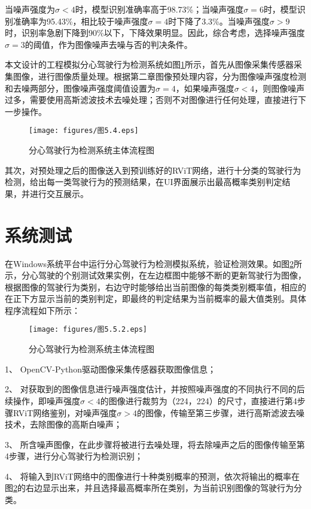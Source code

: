 当噪声强度为$\sigma<4$时，模型识别准确率高于98.73\%；当噪声强度$\sigma=6$时，模型识别准确率为95.43\%，相比较于噪声强度$\sigma=4$时下降了3.3\%。当噪声强度$\sigma>9$时，识别率急剧下降到90\%以下，下降效果明显。因此，综合考虑，选择噪声强度$\sigma=3$的阈值，作为图像噪声去噪与否的判决条件。

本文设计的工程模拟分心驾驶行为检测系统如图\ref{5.4}所示，首先从图像采集传感器采集图像，进行图像质量处理。根据第二章图像预处理内容，分为图像噪声强度检测和去噪两部分，图像噪声强度阈值设置为$\sigma=4$，如果噪声强度$\sigma<4$，则图像噪声过多，需要使用高斯滤波技术去噪处理；否则不对图像进行任何处理，直接进行下一步操作。


\begin{figure}[!ht]
	\centering
	\texttt{[image: figures/图5.4.eps]}
	\caption{分心驾驶行为检测系统主体流程图}\label{5.4}
\end{figure}

其次，对预处理之后的图像送入到预训练好的RViT网络，进行十分类的驾驶行为检测，给出每一类驾驶行为的预测结果，在UI界面展示出最高概率类别判定结果，并进行交互展示。


\section{系统测试}

在Windows系统平台中运行分心驾驶行为检测模拟系统，验证检测效果。如图\ref{5.5}所示，分心驾驶的个别测试效果实例，在左边框图中能够不断的更新驾驶行为图像，根据图像的驾驶行为类别，右边守时能够给出当前图像的每类类别概率值，相应的在正下方显示当前的类别判定，即最终的判定结果为当前概率的最大值类别。具体程序流程如下所示：

\begin{figure}[!ht]
	\centering
	\texttt{[image: figures/图5.5.2.eps]}
	\caption{分心驾驶行为检测系统主体流程图}\label{5.5}
\end{figure}


1、 OpenCV-Python驱动图像采集传感器获取图像信息；

2、 对获取到的图像信息进行噪声强度估计，并按照噪声强度的不同执行不同的后续操作，即噪声强度$\sigma<4$的图像进行裁剪为（224，224）的尺寸，直接进行第4步骤RViT网络鉴别，对噪声强度$\sigma>4$的图像，传输至第三步骤，进行高斯滤波去噪技术，去除图像的高斯白噪声；

3、 所含噪声图像，在此步骤将被进行去噪处理，将去除噪声之后的图像传输至第4步骤，进行分心驾驶行为检测识别；

4、 将输入到RViT网络中的图像进行十种类别概率的预测，依次将输出的概率在图\ref{5.5}的右边显示出来，并且选择最高概率所在类别，为当前识别图像的驾驶行为分类。


